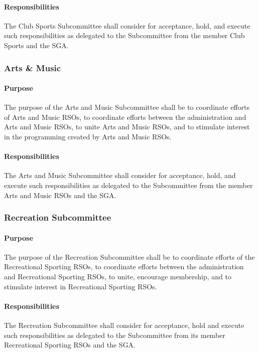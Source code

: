 \documentclass[12pt]{scrreprt}
\begin{document}
\paragraph{Responsibilities}
​The Club Sports Subcommittee shall consider for acceptance, hold,
and execute such responsibilities as delegated to the Subcommittee from the member Club
Sports and the SGA.

\subsubsection{Arts \& Music}

\paragraph{Purpose}
The purpose of the Arts and Music Subcommittee shall be to coordinate efforts
of Arts and Music RSOs, to coordinate efforts between the administration and Arts and
Music RSOs, to unite Arts and Music RSOs, and to stimulate interest in the programming
created by Arts and Music RSOs.

\paragraph{Responsibilities}
​The Arts and Music Subcommittee shall consider for acceptance, hold,
and execute such responsibilities as delegated to the Subcommittee from the member Arts
and Music RSOs and the SGA.

\subsubsection{Recreation Subcommittee}

\paragraph{Purpose}
​The purpose of the Recreation Subcommittee shall be to coordinate efforts of
the Recreational Sporting RSOs, to coordinate efforts between the administration and
Recreational Sporting RSOs, to unite, encourage membership, and to stimulate interest in
Recreational Sporting RSOs.

\paragraph{Responsibilities}
​The Recreation Subcommittee shall consider for acceptance, hold and
execute such responsibilities as delegated to the Subcommittee from its member
Recreational Sporting RSOs and the SGA.
\end{document}
